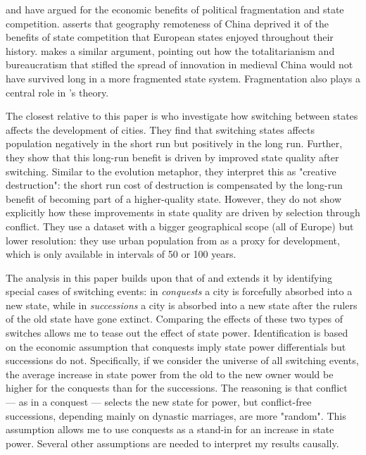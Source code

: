 \documentclass[11pt, a4paper]{article}
\begin{document}
\cite{diamond1997} and \cite{landes1969, landes2006} have argued for the economic benefits of political fragmentation and state competition. \cite{diamond1997} asserts that geography 
remoteness of China deprived it of the benefits of state competition that European states enjoyed throughout their history. \cite{landes2006} makes a similar argument, pointing out how the totalitarianism and bureaucratism that stifled the spread of innovation in medieval China would not have survived long in a more fragmented state system. Fragmentation also plays a central role in \cite{cervellati2022}'s theory.

The closest relative to this paper is \cite{schoenholzer2022} who investigate how switching between states affects the development of cities. They find that switching states affects population negatively in the short run but positively in the long run. Further, they show that this long-run benefit is driven by improved state quality after switching. Similar to the evolution metaphor, they interpret this as "creative destruction": the short run cost of destruction is compensated by the long-run benefit of becoming part of a higher-quality state. However, they do not show explicitly how these improvements in state quality are driven by selection through conflict. They use a dataset with a bigger geographical scope (all of Europe) but lower resolution: they use urban population from \cite{bairoch1988} as a proxy for development, which is only available in intervals of 50 or 100 years. 

The analysis in this paper builds upon that of \cite{schoenholzer2022} and extends it by identifying special cases of switching events: in \textit{conquests} a city is forcefully absorbed into a new state, while in \textit{successions} a city is absorbed into a new state after the rulers of the old state have gone extinct. Comparing the effects of these two types of switches allows me to tease out the effect of state power. Identification is based on the economic assumption that conquests imply state power differentials but successions do not. Specifically, if we consider the universe of all switching events, the average increase in state power from the old to the new owner would be higher for the conquests than for the successions. The reasoning is that conflict --- as in a conquest --- selects the new state for power, but conflict-free successions, depending mainly on dynastic marriages, are more "random". This assumption allows me to use conquests as a stand-in for an increase in state power. Several other assumptions are needed to interpret my results causally.
\end{document}
